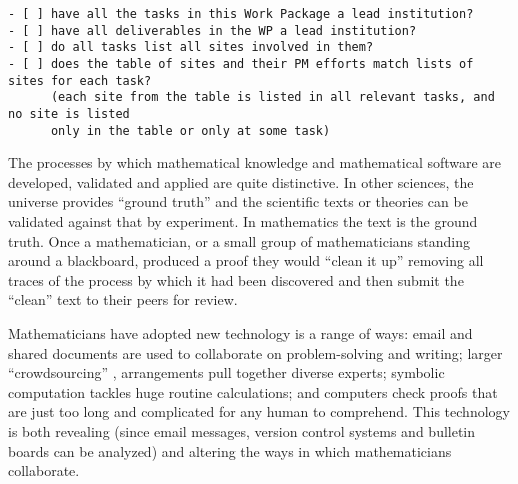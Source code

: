 \begin{draft}
\begin{verbatim}
- [ ] have all the tasks in this Work Package a lead institution?
- [ ] have all deliverables in the WP a lead institution?
- [ ] do all tasks list all sites involved in them? 
- [ ] does the table of sites and their PM efforts match lists of sites for each task?
      (each site from the table is listed in all relevant tasks, and no site is listed
      only in the table or only at some task)
\end{verbatim}
\end{draft}



\begin{workpackage}[id=social-aspects,wphases=0-48,
  title=Social Aspects,
  lead=UO,
  UORM=51,USHRM=8, USORM=6]


\begin{wpobjectives}

The processes by which mathematical knowledge and mathematical
software are developed, validated and applied are quite
distinctive. In other sciences, the universe provides ``ground truth''
and the scientific texts or theories can be validated against that by
experiment. In mathematics the text is the ground truth. Once a
mathematician, or a small group of mathematicians standing around a
blackboard, produced a proof they would ``clean it up'' removing all
traces of the process by which it had been discovered and then submit
the ``clean'' text to their peers for review.

Mathematicians have adopted new technology is a range of ways: email
and shared documents are used to collaborate on problem-solving and
writing; larger ``crowdsourcing'' \cite{polymath_SIAM, PolymathBlog},
arrangements pull together diverse experts; symbolic computation
tackles huge routine calculations; and computers check proofs that are
just too long and complicated for any human to comprehend. This
technology is both revealing (since email messages, version control
systems and bulletin boards can be analyzed) and altering the ways in
which mathematicians collaborate.


\end{wpobjectives}
\end{workpackage}
